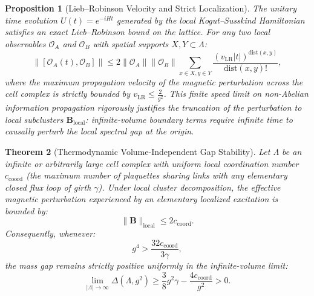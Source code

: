 \documentclass[11pt,reqno]{article}
\newtheorem{theorem}{Theorem}[section]
\newtheorem{proposition}[theorem]{Proposition}
\begin{document}
\begin{proposition}[Lieb--Robinson Velocity and Strict Localization]
\label{prop:lieb_robinson}
The unitary time evolution $U(t) = e^{-i H t}$ generated by the local Kogut--Susskind Hamiltonian satisfies an exact Lieb--Robinson bound on the lattice. For any two local observables $\mathcal{O}_A$ and $\mathcal{O}_B$ with spatial supports $X, Y \subset \Lambda$:
\begin{equation}
    \label{eq:lieb_robinson_bound}
    \| [\mathcal{O}_A(t), \mathcal{O}_B] \| \le 2 \|\mathcal{O}_A\| \|\mathcal{O}_B\| \sum_{x \in X, y \in Y} \frac{(v_{\mathrm{LR}} |t|)^{\mathrm{dist}(x,y)}}{\mathrm{dist}(x,y)!},
\end{equation}
where the maximum propagation velocity of the magnetic perturbation across the cell complex is strictly bounded by $v_{\mathrm{LR}} \le \frac{2}{g^2}$. 
This finite speed limit on non-Abelian information propagation rigorously justifies the truncation of the perturbation to local subclusters $\mathbf{B}_{\mathrm{local}}$: infinite-volume boundary terms require infinite time to causally perturb the local spectral gap at the origin.
\end{proposition}

\begin{theorem}[Thermodynamic Volume-Independent Gap Stability]
\label{thm:thermodynamic_stability}
Let $\Lambda$ be an infinite or arbitrarily large cell complex with uniform local coordination number $c_{\mathrm{coord}}$ (the maximum number of plaquettes sharing links with any elementary closed flux loop of girth $\gamma$).
Under local cluster decomposition, the effective magnetic perturbation experienced by an elementary localized excitation is bounded by:
\begin{equation}
    \label{eq:b_local_norm_bound}
    \|\mathbf{B}\|_{\mathrm{local}} \le 2 c_{\mathrm{coord}}.
\end{equation}
Consequently, whenever:
\begin{equation}
    \label{eq:local_quartic_threshold}
    g^4 > \frac{32 c_{\mathrm{coord}}}{3 \gamma},
\end{equation}
the mass gap remains strictly positive uniformly in the infinite-volume limit:
\begin{equation}
    \label{eq:thermodynamic_gap_floor}
    \lim_{|\Lambda| \to \infty} \Delta(\Lambda, g^2) \ge \frac{3}{8} g^2 \gamma - \frac{4 c_{\mathrm{coord}}}{g^2} > 0.
\end{equation}
\end{theorem}
\end{document}
